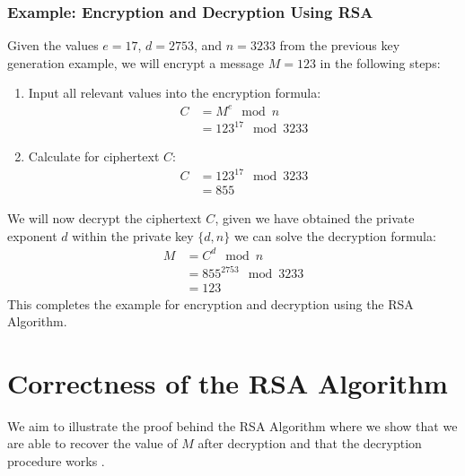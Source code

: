 \documentclass{article}
\begin{document}
\subsubsection{Example: Encryption and Decryption Using RSA}
Given the values $e = 17$, $d = 2753$, and $n = 3233$ from the previous key generation example, we will encrypt a message $M = 123$ in the following steps:
\begin{enumerate}
    \item Input all relevant values into the encryption formula:
\begin{equation}
\begin{aligned}
C &= M^e \mod n\\ 
&= 123^{17} \mod 3233
\end{aligned}
\end{equation}
\item Calculate for ciphertext $C$:
\begin{equation}
\begin{aligned}
C &= 123^{17} \mod 3233\\ 
&= 855
\end{aligned}
\end{equation}
\end{enumerate}
We will now decrypt the ciphertext $C$, given we have obtained the private exponent $d$ within the private key $\{d, n\}$ we can solve the decryption formula:
\begin{equation}
\begin{aligned}
M &= C^d \mod n\\
&= 855^{2753} \mod 3233\\
&= 123
\end{aligned}
\end{equation}
This completes the example for encryption and decryption using the RSA Algorithm.

\section{Correctness of the RSA Algorithm}
We aim to illustrate the proof behind the RSA Algorithm where we show that we are able to recover the value of $M$ after decryption and that the decryption procedure works \cite{sridharan}. 
\end{document}
